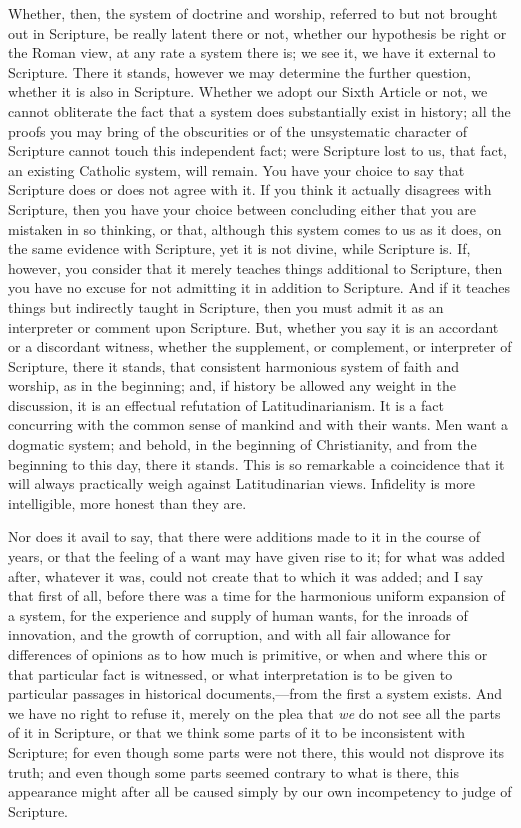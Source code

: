 Whether, then, the system of doctrine and worship, referred to but
not brought out in Scripture, be really latent there or not, whether
our hypothesis be right or the Roman view, at any rate a system there
is; we see it, we have it external to Scripture. There it stands,
however we may determine the further question, whether it is also in
Scripture. Whether we adopt our Sixth Article or not, we cannot
obliterate the fact that a system does substantially exist in history;
all the proofs you may bring of the obscurities or of the unsystematic
character of Scripture cannot touch this independent fact; were
Scripture lost to us, that fact, an existing Catholic system, will
remain. You have your choice to say that Scripture does or does not
agree with it. If you think it actually disagrees with Scripture, then
you have your choice between concluding either that you are
mistaken in so thinking, or that, although this system comes to us as
it does, on the same evidence with Scripture, yet it is not divine,
while Scripture is. If, however, you consider that it merely teaches
things additional to Scripture, then you have no excuse for not
admitting it in addition to Scripture. And if it teaches things but
indirectly taught in Scripture, then you must admit it as an
interpreter or comment upon Scripture. But, whether you say it is an
accordant or a discordant witness, whether the supplement, or
complement, or interpreter of Scripture, there it stands, that
consistent harmonious system of faith and worship, as in the
beginning; and, if history be allowed any weight in the discussion, it
is an effectual refutation of Latitudinarianism. It is a fact
concurring with the common sense of mankind and with their wants. Men
want a dogmatic system; and behold, in the beginning of Christianity,
and from the beginning to this day, there it stands. This is so
remarkable a coincidence that it will always practically weigh against
Latitudinarian views. Infidelity is more intelligible, more honest
than they are.

Nor does it avail to say, that there were additions made to it in
the course of years, or that the feeling of a want may have given rise
to it; for what was added after, whatever it was, could not create
that to which it was added; and I say that first of all, before there
was a time for the harmonious uniform expansion of a system, for the
experience and supply of human wants, for the inroads of innovation,
and the growth of corruption, and with all fair allowance for
differences of opinions as to how much is primitive, or when and where
this or that particular fact is witnessed, or what interpretation is
to be given to particular passages in historical documents,—from the first a system exists. And we have no right
to refuse it, merely on the plea that \emph{we} do not see all the
parts of it in Scripture, or that we think some parts of it to be
inconsistent with Scripture; for even though some parts were not
there, this would not disprove its truth; and even though some parts
seemed contrary to what is there, this appearance might after all be
caused simply by our own incompetency to judge of Scripture.

